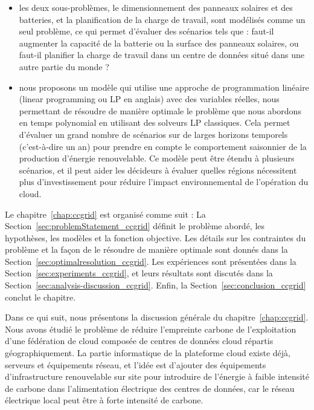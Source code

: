 \begin{itemize}
    
    \item les deux sous-problèmes, le dimensionnement des panneaux solaires et des batteries, et la planification de la charge de travail, sont modélisés comme un seul problème, ce qui permet d'évaluer des scénarios tels que : faut-il augmenter la capacité de la batterie ou la surface des panneaux solaires, ou faut-il planifier la charge de travail dans un centre de données situé dans une autre partie du monde ?
    
    \item nous proposons un modèle qui utilise une approche de programmation linéaire (linear programming ou LP en anglais) avec des variables réelles, nous permettant de résoudre de manière optimale le problème que nous abordons en temps polynomial en utilisant des solveurs LP classiques. Cela permet d'évaluer un grand nombre de scénarios sur de larges horizons temporels (c'est-à-dire un an) pour prendre en compte le comportement saisonnier de la production d'énergie renouvelable. Ce modèle peut être étendu à plusieurs scénarios, et il peut aider les décideurs à évaluer quelles régions nécessitent plus d'investissement pour réduire l'impact environnemental de l'opération du cloud.
    
\end{itemize}


Le chapitre~\ref{chap:ccgrid} est organisé comme suit : La Section~\ref{sec:problemStatement_ccgrid} définit le problème abordé, les hypothèses, les modèles et la fonction objective. Les détails sur les contraintes du problème et la façon de le résoudre de manière optimale sont donnés dans la Section~\ref{sec:optimalresolution_ccgrid}. Les expériences sont présentées dans la Section~\ref{sec:experiments_ccgrid}, et leurs résultats sont discutés dans la Section~\ref{sec:analysis-discussion_ccgrid}. Enfin, la Section~\ref{sec:conclusion_ccgrid} conclut le chapitre.


Dans ce qui suit, nous présentons la discussion générale du chapitre~\ref{chap:ccgrid}. Nous avons étudié le problème de réduire l'empreinte carbone de l'exploitation d'une fédération de cloud composée de centres de données cloud répartis géographiquement. La partie informatique de la plateforme cloud existe déjà, serveurs et équipements réseau, et l'idée est d'ajouter des équipements d'infrastructure renouvelable sur site pour introduire de l'énergie à faible intensité de carbone dans l'alimentation électrique des centres de données, car le réseau électrique local peut être à forte intensité de carbone.

